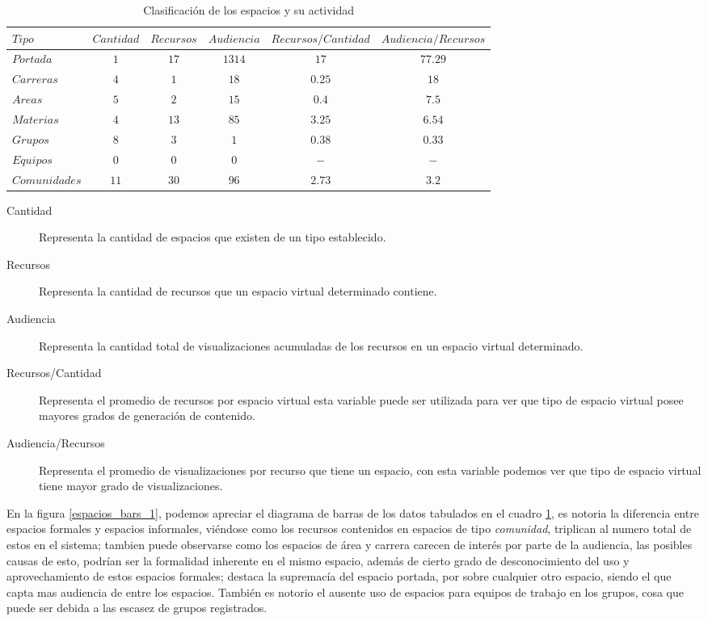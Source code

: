\begin{table}
\centering
\begin{tabular}{l|c c c c c}
$Tipo$ & $Cantidad$ & $Recursos$ & $Audiencia$ &
$Recursos/Cantidad$ & $Audiencia/Recursos$ \\
\hline
$Portada    $ & $ 1$ & $17$ & $1314$ & $17   $ & $77.29$ \\
$Carreras   $ & $ 4$ & $ 1$ & $  18$ & $ 0.25$ & $18   $ \\
$Areas      $ & $ 5$ & $ 2$ & $  15$ & $ 0.4 $ & $ 7.5 $ \\
$Materias   $ & $ 4$ & $13$ & $  85$ & $ 3.25$ & $ 6.54$ \\
$Grupos     $ & $ 8$ & $ 3$ & $   1$ & $ 0.38$ & $ 0.33$ \\
$Equipos    $ & $ 0$ & $ 0$ & $   0$ & $    -$ & $ -   $ \\
$Comunidades$ & $11$ & $30$ & $  96$ & $ 2.73$ & $ 3.2 $ \\
\end{tabular}
\caption{Clasificación de los espacios y su actividad}
\label{espacios_tabla_1}
\end{table}

\begin{description}
\item [Cantidad] Representa la cantidad de espacios que existen de un tipo
establecido.
\item [Recursos] Representa la cantidad de recursos que un espacio virtual
determinado contiene.
\item [Audiencia] Representa la cantidad total de visualizaciones acumuladas de
los recursos en un espacio virtual determinado.
\item [Recursos/Cantidad] Representa el promedio de recursos por espacio virtual
esta variable puede ser utilizada para ver que tipo de espacio virtual posee
mayores grados de generación de contenido.
\item [Audiencia/Recursos] Representa el promedio de visualizaciones por recurso
que tiene un espacio, con esta variable podemos ver que tipo de espacio virtual
tiene mayor grado de visualizaciones.
\end{description}

En la figura \ref{espacios_bars_1}, podemos apreciar el diagrama de barras de
los datos tabulados en el cuadro \ref{espacios_tabla_1}, es notoria la
diferencia entre espacios formales y espacios informales, viéndose como los
recursos contenidos en espacios de tipo \emph{comunidad}, triplican al numero
total de estos en el sistema; tambien puede observarse como los espacios de área
y carrera carecen de interés por parte de la audiencia, las posibles causas de
esto, podrían ser la formalidad inherente en el mismo espacio, además de cierto
grado de desconocimiento del uso y aprovechamiento de estos espacios formales;
destaca la supremacía del espacio portada, por sobre cualquier otro espacio,
siendo el que capta mas audiencia de entre los espacios. También es notorio el
ausente uso de espacios para equipos de trabajo en los grupos, cosa que puede
ser debida a las escasez de grupos registrados.


